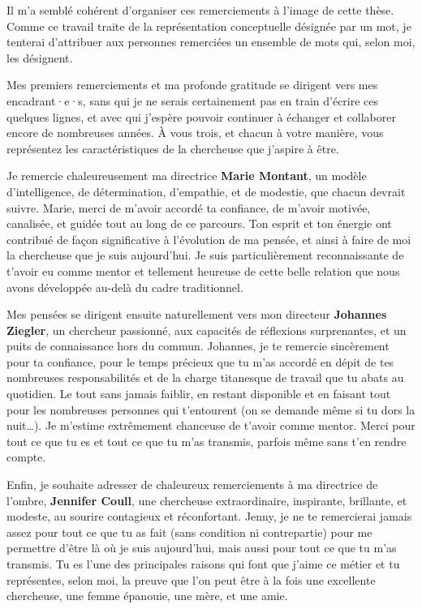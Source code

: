 \documentclass[
  a4paper,12pt,twoside,onecolumn,openright,final,oldfontcommands]{memoir}
\begin{document}
Il m'a semblé cohérent d'organiser ces remerciements à l'image de cette thèse. Comme ce travail traite de la représentation conceptuelle désignée par un mot, je tenterai d'attribuer aux personnes remerciées un ensemble de mots qui, selon moi, les désignent.

Mes premiers remerciements et ma profonde gratitude se dirigent vers mes encadrant·e·s, sans qui je ne serais certainement pas en train d'écrire ces quelques lignes, et avec qui j'espère pouvoir continuer à échanger et collaborer encore de nombreuses années. À vous trois, et chacun à votre manière, vous représentez les caractéristiques de la chercheuse que j'aspire à être.

Je remercie chaleureusement ma directrice \textbf{Marie Montant}, un modèle d'intelligence, de détermination, d'empathie, et de modestie, que chacun devrait suivre. Marie, merci de m'avoir accordé ta confiance, de m'avoir motivée, canalisée, et guidée tout au long de ce parcours. Ton esprit et ton énergie ont contribué de façon significative à l'évolution de ma pensée, et ainsi à faire de moi la chercheuse que je suis aujourd'hui. Je suis particulièrement reconnaissante de t'avoir eu comme mentor et tellement heureuse de cette belle relation que nous avons développée au-delà du cadre traditionnel.

Mes pensées se dirigent ensuite naturellement vers mon directeur \textbf{Johannes Ziegler}, un chercheur passionné, aux capacités de réflexions surprenantes, et un puits de connaissance hors du commun. Johannes, je te remercie sincèrement pour ta confiance, pour le temps précieux que tu m'as accordé en dépit de tes nombreuses responsabilités et de la charge titanesque de travail que tu abats au quotidien. Le tout sans jamais faiblir, en restant disponible et en faisant tout pour les nombreuses personnes qui t'entourent (on se demande même si tu dors la nuit\ldots). Je m'estime extrêmement chanceuse de t'avoir comme mentor. Merci pour tout ce que tu es et tout ce que tu m'as transmis, parfois même sans t'en rendre compte.

Enfin, je souhaite adresser de chaleureux remerciements à ma directrice de l'ombre, \textbf{Jennifer Coull}, une chercheuse extraordinaire, inspirante, brillante, et modeste, au sourire contagieux et réconfortant. Jenny, je ne te remercierai jamais assez pour tout ce que tu as fait (sans condition ni contrepartie) pour me permettre d'être là où je suis aujourd'hui, mais aussi pour tout ce que tu m'as transmis. Tu es l'une des principales raisons qui font que j'aime ce métier et tu représentes, selon moi, la preuve que l'on peut être à la fois une excellente chercheuse, une femme épanouie, une mère, et une amie.
\end{document}
